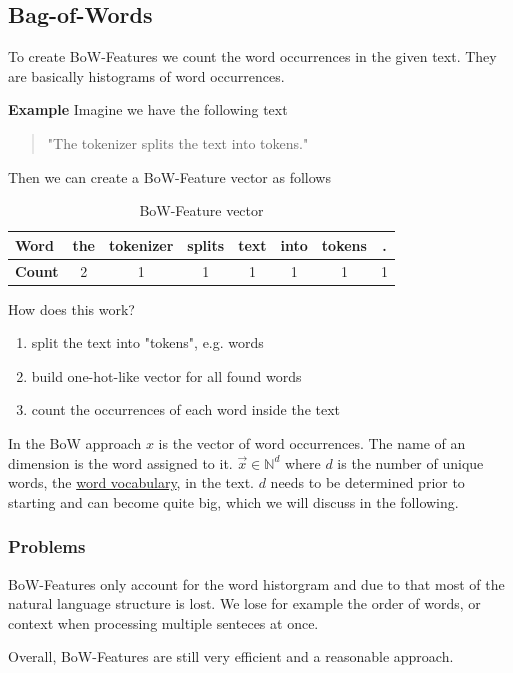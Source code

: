 \subsection{Bag-of-Words}
To create BoW-Features we count the word occurrences in the given text. They are basically histograms of word occurrences.

\textbf{Example} Imagine we have the following text
\begin{quote}
  "The tokenizer splits the text into tokens."
\end{quote}
Then we can create a BoW-Feature vector as follows

\begin{table}[h]
  \centering
  \begin{tabular}{|l|ccccccc|}
    \hline
    \textbf{Word} & the & tokenizer & splits & text & into & tokens & . \\
    \hline
    \textbf{Count} & 2 & 1 & 1 & 1 & 1 & 1 & 1 \\
    \hline
  \end{tabular}
  \caption{BoW-Feature vector}
  \label{tab:bow}
\end{table}

How does this work?
\begin{enumerate}
  \item split the text into "tokens", e.g. words
  \item build one-hot-like vector for all found words
  \item count the occurrences of each word inside the text
\end{enumerate}
In the BoW approach $x$ is the vector of word occurrences. The name of an dimension is the word assigned to it.
$\vec{x} \in \mathbb{N}^d$ where $d$ is the number of unique words, the \underline{word vocabulary}, in the text.
$d$ needs to be determined prior to starting and can become quite big, which we will discuss in the following.
\subsubsection{Problems}
BoW-Features only account for the word historgram and due to that most of the natural language structure is lost.
We lose for example the order of words, or context when processing multiple senteces at once.

Overall, BoW-Features are still very efficient and a reasonable approach.

